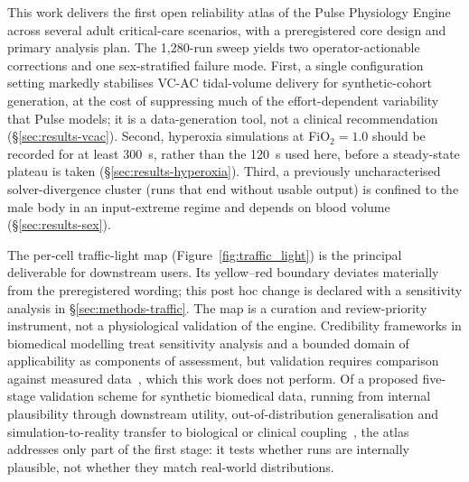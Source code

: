\documentclass[pdflatex,sn-nature]{sn-jnl}%
\begin{document}
This work delivers the first open reliability atlas of the Pulse Physiology Engine across several adult critical-care scenarios, with a preregistered core design and primary analysis plan. The 1{,}280-run sweep yields two operator-actionable corrections and one sex-stratified failure mode. First, a single configuration setting markedly stabilises VC-AC tidal-volume delivery for synthetic-cohort generation, at the cost of suppressing much of the effort-dependent variability that Pulse models; it is a data-generation tool, not a clinical recommendation (\S\ref{sec:results-vcac}). Second, hyperoxia simulations at FiO$_2 = 1.0$ should be recorded for at least 300~s, rather than the 120~s used here, before a steady-state plateau is taken (\S\ref{sec:results-hyperoxia}). Third, a previously uncharacterised solver-divergence cluster (runs that end without usable output) is confined to the male body in an input-extreme regime and depends on blood volume (\S\ref{sec:results-sex}).

The per-cell traffic-light map (Figure~\ref{fig:traffic_light}) is the principal deliverable for downstream users. Its yellow--red boundary deviates materially from the preregistered wording; this post hoc change is declared with a sensitivity analysis in \S\ref{sec:methods-traffic}. The map is a curation and review-priority instrument, not a physiological validation of the engine. Credibility frameworks in biomedical modelling treat sensitivity analysis and a bounded domain of applicability as components of assessment, but validation requires comparison against measured data~\cite{viceconti2021insilico}, which this work does not perform. Of a proposed five-stage validation scheme for synthetic biomedical data, running from internal plausibility through downstream utility, out-of-distribution generalisation and simulation-to-reality transfer to biological or clinical coupling~\cite{victoriano2026sim2real}, the atlas addresses only part of the first stage: it tests whether runs are internally plausible, not whether they match real-world distributions.
\end{document}
